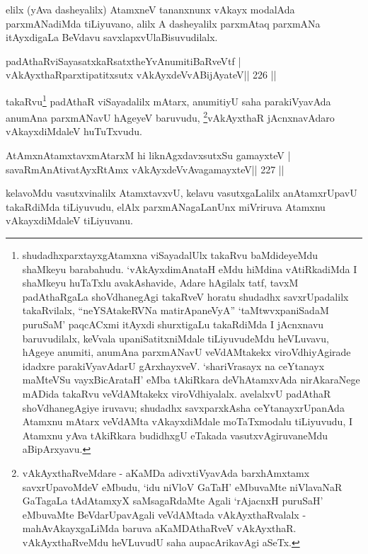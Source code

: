 \begin{artha}
elilx (yAva dasheyalilx) AtamxneV tananxnunx vAkayx modalAda parxmANadiMda tiLiyuvano, alilx A dasheyalilx parxmAtaq parxmANa itAyxdigaLa BeVdavu savxlapxvU\break laBisuvudilalx.
\end{artha}

\begin{shl}
padAthaRviSayasatxkaRsatxtheYvAnumitiBaRveVtf |
vAkAyxthaRparxtipatitxsutx vAkAyxdeVvABijAyateV\hfill || 226 ||
\end{shl}

\begin{artha}
takaRvu\footnote{shudadhxparxtayxgAtamxna viSayadalUlx takaRvu baMdideyeMdu shaMkeyu barabahudu. `vAkAyxdimAnataH eMdu hiMdina vAtiRkadiMda I shaMkeyu huTaTxlu avakAshavide, Adare hAgilalx tatf, tavxM padAthaRgaLa shoVdhanegAgi takaRveV horatu shudadhx savxrUpadalilx takaRvilalx, ``neYSAtakeRVNa matirApaneVyA'' `taMtwvxpaniSadaM puruSaM' paqcACxmi itAyxdi shurxtigaLu takaRdiMda I jAcnxnavu baruvudilalx, keVvala upaniSatitxniMdale tiLiyuvudeMdu heVLuvavu, hAgeye anumiti, anumAna parxmANavU veVdAMtakekx viroVdhiyAgirade idadxre parakiVyavAdarU gArxhayxveV. `shariVrasayx na ceYtanayx maMteVSu vayxBicArataH' eMba tAkiRkara deVhAtamxvAda nirAkaraNege mADida takaRvu veVdAMtakekx viroVdhiyalalx. avelalxvU padAthaR shoVdhanegAgiye iruvavu; shudadhx savxparxkAsha ceYtanayxrUpanAda Atamxnu mAtarx veVdAMta vAkayxdiMdale moTaTxmodalu tiLiyuvudu, I Atamxnu yAva tAkiRkara budidhxgU eTakada vasutxvAgiruvaneMdu aBipArxyavu.} padAthaR viSayadalilx mAtarx, anumitiyU saha parakiVyavAda anumAna parxmANavU hAgeyeV baruvudu, \footnote{vAkAyxthaRveMdare - aKaMDa adivxtiVyavAda barxhAmxtamx savxrUpavoMdeV eMbudu, `idu niVloV GaTaH' eMbuvaMte niVlavaNaR GaTagaLa tAdAtamxyX saMsagaRdaMte Agali `rAjacnxH puruSaH' eMbuvaMte BeVdarUpavAgali veVdAMtada vAkAyxthaRvalalx - mahAvAkayxgaLiMda baruva aKaMDAthaRveV vAkAyxthaR. vAkAyxthaRveMdu heVLuvudU saha aupacArikavAgi aSeTx.}vAkAyxthaR jAcnxnavAdaro vAkayxdiMdaleV huTuTxvudu.
\end{artha}


\begin{shl}
AtAmxnAtamxtavxmAtarxM hi liknAgxdavxsutxSu gamayxteV |
savaRmAnAtivatAyxRtAmx vAkAyxdeVvAvagamayxteV\hfill || 227 ||
\end{shl}

\begin{artha}
kelavoMdu vasutxvinalilx AtamxtavxvU, kelavu vasutxgaLalilx anAtamxrUpavU takaRdiMda tiLiyuvudu, elAlx parxmANagaLanUnx miVriruva Atamxnu vAkayxdiMdaleV tiLiyuvanu.
\end{artha}

